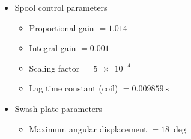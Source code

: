 \documentclass[12pt,a4paper,oneside]{book}
\begin{document}
\begin{onehalfspace}
{\begin{itemize}
\begin{itemize}
			\item Orifice opening offset T-A $=\SI{1.9e-4}{\meter}$
			\item Orifice opening offset T-B $=\SI{1.9e-4}{\meter}$
			\item Leakage area $=\SI{1e-8}{\square\meter}$
		\end{itemize}
		\item Spool control parameters
		\begin{itemize}
			\item Proportional gain $=1.014$
			\item Integral gain $=0.001$			
			\item Scaling factor $=\SI{5e-4}{}$
			\item Lag time constant (coil) $=\SI{0.009859}{\second}$
		\end{itemize}
		\item Swash-plate parameters
		\begin{itemize}
			\item Maximum angular displacement $=\SI{18}{\deg}$
		\end{itemize}
	\end{itemize}
}

\end{onehalfspace}
\end{document}
